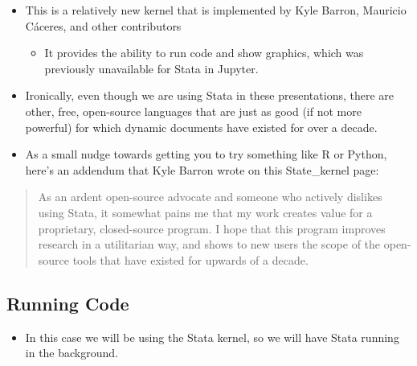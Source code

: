 \documentclass[10pt,parskip=half,
	toc=sectionentrywithdots,
	bibliography=totocnumbered,
	captions=tableheading,numbers=noendperiod]{scrartcl}
\providecommand{\tightlist}{%
  \setlength{\itemsep}{0pt}\setlength{\parskip}{0pt}}
\begin{document}
\begin{itemize}
\tightlist
\item
  This is a relatively new kernel that is implemented by Kyle Barron,
  Mauricio Cáceres, and other contributors

  \begin{itemize}
  \tightlist
  \item
    It provides the ability to run code and show graphics, which was
    previously unavailable for Stata in Jupyter.
  \end{itemize}
\item
  Ironically, even though we are using Stata in these presentations,
  there are other, free, open-source languages that are just as good (if
  not more powerful) for which dynamic documents have existed for over a
  decade.
\item
  As a small nudge towards getting you to try something like R or
  Python, here's an addendum that Kyle Barron wrote on this
  State\_kernel page:
\end{itemize}

\begin{quote}
As an ardent open-source advocate and someone who actively dislikes
using Stata, it somewhat pains me that my work creates value for a
proprietary, closed-source program. I hope that this program improves
research in a utilitarian way, and shows to new users the scope of the
open-source tools that have existed for upwards of a decade.
\end{quote}

\hypertarget{running-code}{%
\subsection{Running Code}\label{running-code}}

\begin{itemize}
\tightlist
\item
  In this case we will be using the Stata kernel, so we will have Stata
  running in the background.
\end{itemize}
\end{document}
